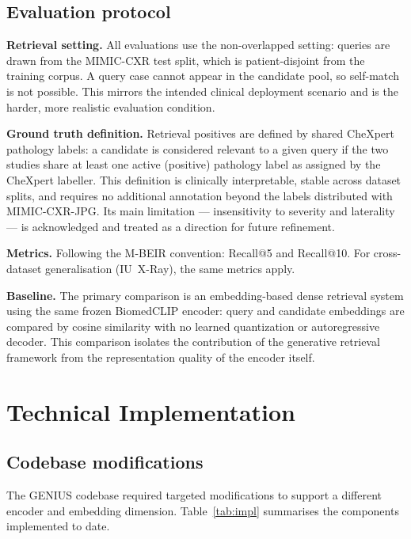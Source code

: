 \documentclass[11pt,a4paper]{article}
\begin{document}
\subsection{Evaluation protocol}
\label{sec:eval}

\textbf{Retrieval setting.}
All evaluations use the non-overlapped setting: queries are drawn from the
MIMIC-CXR test split, which is patient-disjoint from the training corpus.
A query case cannot appear in the candidate pool, so self-match is not possible.
This mirrors the intended clinical deployment scenario and is the harder,
more realistic evaluation condition.

\textbf{Ground truth definition.}
Retrieval positives are defined by shared CheXpert pathology labels: a
candidate is considered relevant to a given query if the two studies share at
least one active (positive) pathology label as assigned by the CheXpert
labeller.
This definition is clinically interpretable, stable across dataset splits, and
requires no additional annotation beyond the labels distributed with
MIMIC-CXR-JPG.
Its main limitation --- insensitivity to severity and laterality --- is
acknowledged and treated as a direction for future refinement.

\textbf{Metrics.}
Following the M-BEIR convention: Recall@5 and Recall@10.
For cross-dataset generalisation (IU~X-Ray), the same metrics apply.

\textbf{Baseline.}
The primary comparison is an embedding-based dense retrieval system using the
same frozen BiomedCLIP encoder: query and candidate embeddings are compared by
cosine similarity with no learned quantization or autoregressive decoder.
This comparison isolates the contribution of the generative retrieval framework
from the representation quality of the encoder itself.

\section{Technical Implementation}

\subsection{Codebase modifications}

The GENIUS codebase required targeted modifications to support a different
encoder and embedding dimension.
Table~\ref{tab:impl} summarises the components implemented to date.
\end{document}
